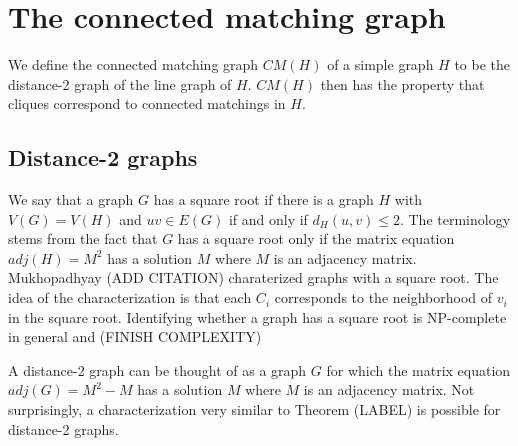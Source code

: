 %
%


\section{The connected matching graph}

We define the connected matching graph $CM(H)$ of a simple graph $H$ to be the distance-2 graph of the line graph of $H$.  $CM(H)$ then has the property that cliques correspond to connected matchings in $H$.  

\subsection{Distance-2 graphs}
We say that a graph $G$ has a square root if there is a graph $H$ with $V(G) = V(H)$ and $uv \in E(G)$ if and only if $d_H(u,v) \leq 2$.  The terminology stems from the fact that $G$ has a square root only if the matrix equation $adj(H) = M^2$ has a solution $M$ where $M$ is an adjacency matrix.  Mukhopadhyay (ADD CITATION) charaterized graphs with a square root. 
The idea of the characterization is that each $C_i$ corresponds to the neighborhood of $v_i$ in the square root.  Identifying whether a graph has a square root is NP-complete in general and (FINISH COMPLEXITY)

A distance-2 graph can be thought of as a graph $G$ for which the matrix equation $adj(G) = M^2-M$ has a solution $M$ where $M$ is an adjacency matrix.  Not surprisingly, a characterization very similar to Theorem (LABEL) is possible for distance-2 graphs.

